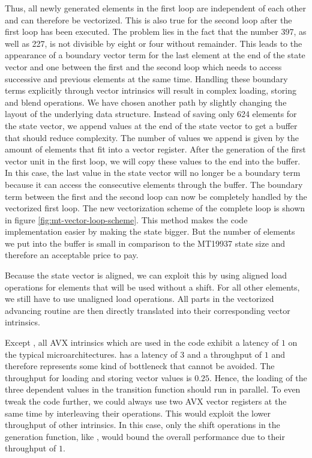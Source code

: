 \documentclass{stdlocal}
\begin{document}
    Thus, all newly generated elements in the first loop are independent of each other and can therefore be vectorized.
    This is also true for the second loop after the first loop has been executed.
    The problem lies in the fact that the number 397, as well as 227, is not divisible by eight or four without remainder.
    This leads to the appearance of a boundary vector term for the last element at the end of the state vector and one between the first and the second loop which needs to access successive and previous elements at the same time.
    Handling these boundary terms explicitly through vector intrinsics will result in complex loading, storing and blend operations.
    We have chosen another path by slightly changing the layout of the underlying data structure.
    Instead of saving only 624 elements for the state vector, we append values at the end of the state vector to get a buffer that should reduce complexity.
    The number of values we append is given by the amount of elements that fit into a vector register.
    After the generation of the first vector unit in the first loop, we will copy these values to the end into the buffer.
    In this case, the last value in the state vector will no longer be a boundary term because it can access the consecutive elements through the buffer.
    The boundary term between the first and the second loop can now be completely handled by the vectorized first loop.
    The new vectorization scheme of the complete loop is shown in figure \ref{fig:mt-vector-loop-scheme}.
    This method makes the code implementation easier by making the state bigger.
    But the number of elements we put into the buffer is small in comparison to the MT19937 state size and therefore an acceptable price to pay.


    Because the state vector is aligned, we can exploit this by using aligned load operations for elements that will be used without a shift.
    For all other elements, we still have to use unaligned load operations.
    All parts in the vectorized advancing routine are then directly translated into their corresponding vector intrinsics.

    Except , all AVX intrinsics which are used in the code exhibit a latency of $1$ on the typical microarchitectures.
     has a latency of $3$ and a throughput of $1$ and therefore represents some kind of bottleneck that cannot be avoided.
    The throughput for loading and storing vector values is $0.25$.
    Hence, the loading of the three dependent values in the transition function should run in parallel.
    To even tweak the code further, we could always use two AVX vector registers at the same time by interleaving their operations.
    This would exploit the lower throughput of other intrinsics.
    In this case, only the shift operations in the generation function, like , would bound the overall performance due to their throughput of $1$.
    \autocite{intel-intrinsics-guide,fog2019d}
\end{document}
